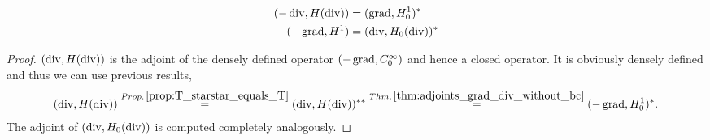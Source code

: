 \documentclass[../master_thesis.tex]{subfiles}
\begin{document}
\begin{corollary}
    \begin{align}
        (-\operatorname{div}, H(\operatorname{div})) &= (\operatorname{grad}, H^1_0)^* \\
        (-\operatorname{grad}, H^1) &= (\operatorname{div}, H_0(\operatorname{div}))^*
    \end{align}
\end{corollary}
\begin{proof}
    $(\operatorname{div}, H(\operatorname{div}))$ is the adjoint of the densely defined operator 
    $(-\operatorname{grad}, C_0^\infty)$ and hence a closed operator. It is 
    obviously densely defined and thus we can use previous results,
    \begin{align*}
        (\operatorname{div}, H(\operatorname{div})) 
        \stackrel{Prop.\,\ref{prop:T_starstar_equals_T}}{=}(\operatorname{div}, H(\operatorname{div}))^{**} 
        \stackrel{Thm.\,\ref{thm:adjoints_grad_div_without_bc}}{=}(-\operatorname{grad}, H^1_0)^*.
    \end{align*}
    The adjoint of $(\operatorname{div}, H_0(\operatorname{div}))$ is computed completely analogously.
\end{proof}



\end{document}

